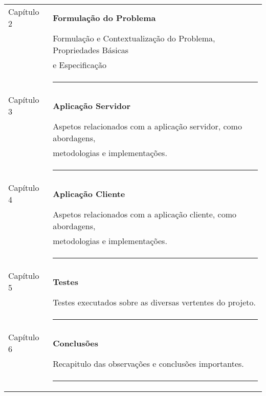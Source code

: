 \begin{tabular}{ll}
	Capítulo 2 & {\bf Formulação do Problema} \\
	& Formulação e Contextualização do Problema, Propriedades Básicas \\
	& e Especificação\\
	&\rule{75mm}{0.5pt}\\
	Capítulo 3 & {\bf Aplicação Servidor} \\
	& Aspetos relacionados com a aplicação servidor, como abordagens, \\
	& metodologias e implementações.\\
	&\rule{75mm}{0.5pt}\\
	Capítulo 4 & {\bf Aplicação Cliente} \\
	& Aspetos relacionados com a aplicação cliente, como abordagens, \\
	&metodologias e implementações.\\
	&\rule{75mm}{0.5pt}\\
	Capítulo 5 & {\bf Testes} \\
	& Testes executados sobre as diversas vertentes do projeto.\\
	&\rule{75mm}{0.5pt}\\
	Capítulo 6 & {\bf Conclusões} \\
	& Recapitulo das observações e conclusões importantes.\\
	&\rule{75mm}{0.5pt}\\
\end{tabular}